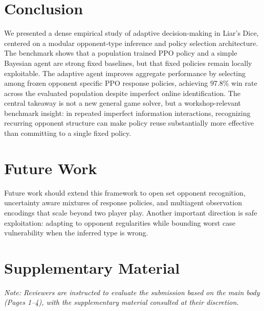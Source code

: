 \documentclass[letterpaper]{article} %
\begin{document}
\section{Conclusion}
We presented a dense empirical study of adaptive decision-making in Liar's Dice, centered on a modular opponent-type inference and policy selection architecture. The benchmark shows that a population trained PPO policy and a simple Bayesian agent are strong fixed baselines, but that fixed policies remain locally exploitable. The adaptive agent improves aggregate performance by selecting among frozen opponent specific PPO response policies, achieving 97.8\% win rate across the evaluated population despite imperfect online identification. The central takeaway is not a new general game solver, but a workshop-relevant benchmark insight: in repeated imperfect information interactions, recognizing recurring opponent structure can make policy reuse substantially more effective than committing to a single fixed policy.

\section{Future Work}
Future work should extend this framework to open set opponent recognition, uncertainty aware mixtures of response policies, and multiagent observation encodings that scale beyond two player play. Another important direction is safe exploitation: adapting to opponent regularities while bounding worst case vulnerability when the inferred type is wrong.

\clearpage



\clearpage
\appendix
\section*{Supplementary Material}
\noindent\textit{Note: Reviewers are instructed to evaluate the submission based on the main body (Pages 1--4), with the supplementary material consulted at their discretion.}

\end{document}
